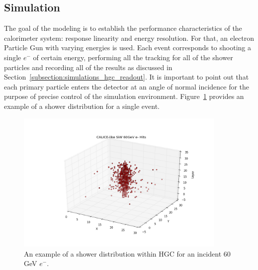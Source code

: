 \subsection{Simulation}
The goal of the modeling is to establish the performance characteristics of the calorimeter system: response linearity and energy resolution. For that, an electron Particle Gun with varying energies is used. Each event corresponds to shooting a single $e^-$ of certain energy, performing all the tracking for all of the shower particles and recording all of the results as discussed in Section~\ref{subsection:simulations_hgc_readout}. It is important to point out that each primary particle enters the detector at an angle of normal incidence for the purpose of precise control of the simulation environment. Figure~\ref{fig:simulations_hgc_scatter60} provides an example of a shower distribution for a single event.
\begin{figure}[htbp]
    \centering
    \includegraphics[width=0.9\textwidth]{figures/ch_simulations/hgc/scatter_3d/scatter_3D_60GeV.png}
    \caption{An example of a shower distribution within {\sc HGC} for an incident 60 GeV $e^-$.}
    \label{fig:simulations_hgc_scatter60}
 \end{figure}


